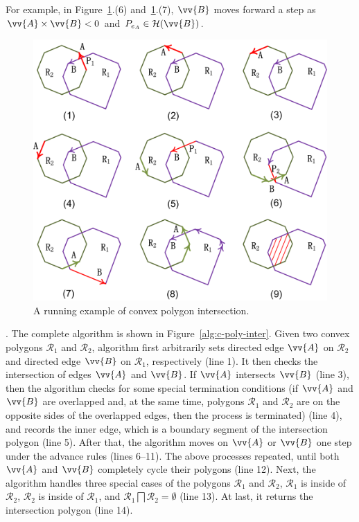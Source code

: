 For example, in Figure~\ref{fig:c-poly-inter}.(6) and~\ref{fig:c-poly-inter}.(7), $\vv{B}$ moves forward a step as $\vv{A} \times \vv{B} < 0$ and $P_{e_A} \in \mathcal{H}(\vv{B})$.


\begin{figure}[tb!]
	\centering
	\includegraphics[scale=0.92]{figures/Fig-convex-poly-inter.png}
	\caption{\small A running example of convex polygon intersection.}
	\vspace{-1ex}
	\label{fig:c-poly-inter}
\end{figure}


. The complete algorithm is shown in Figure~\ref{alg:c-poly-inter}.
Given two convex polygons $\mathcal{R}_1$ and $\mathcal{R}_2$, algorithm \cpia first arbitrarily sets directed edge $\vv{A}$ on $\mathcal{R}_2$ and directed edge $\vv{B}$ on $\mathcal{R}_1$, respectively (line 1).
%
It then checks the intersection of edges $\vv{A}$ and $\vv{B}$. If $\vv{A}$ intersects $\vv{B}$ (line 3), then the algorithm checks for some special termination conditions (\eg if $\vv{A}$ and $\vv{B}$ are overlapped and, at the same time, polygons $\mathcal{R}_1$ and $\mathcal{R}_2$ are on the opposite sides of the overlapped edges, then the process is terminated) (line 4), and records the inner edge, which is a boundary segment of the intersection polygon (line 5).
After that, the algorithm moves on $\vv{A}$ or $\vv{B}$ one step under the advance rules (lines 6--11).
The above processes repeated, until both $\vv{A}$ and $\vv{B}$ completely cycle their polygons (line 12).
%
Next, the algorithm handles three special cases of the polygons $\mathcal{R}_1$ and $\mathcal{R}_2$, \ie $\mathcal{R}_1$ is inside of $\mathcal{R}_2$, $\mathcal{R}_2$ is inside of $\mathcal{R}_1$, and $\mathcal{R}_1 \bigsqcap \mathcal{R}_2 = \emptyset$ (line 13).
%
At last, it returns the intersection polygon (line 14).





